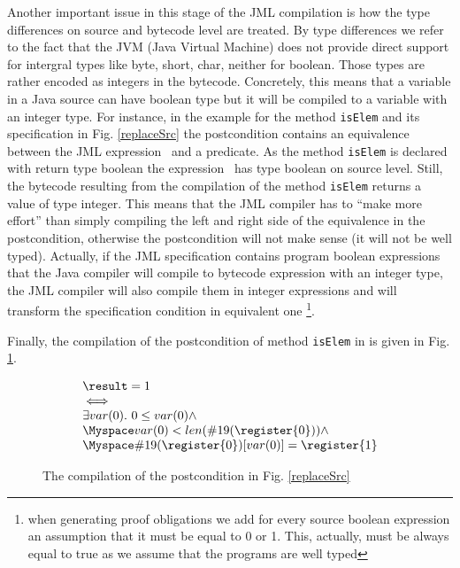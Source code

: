 \begin{enumerate}
Another important issue in this stage of the JML compilation is how the type differences on source and bytecode level are treated. 
By type differences we refer to the fact that the JVM (Java Virtual Machine) does not provide direct support for intergral types like byte, short, char, neither for boolean. Those types are rather encoded as integers in the bytecode. Concretely, this means that a variable in a Java source can have boolean type but it will be compiled to a variable with
an integer type.%
 For instance, in the example for the method 
\texttt{isElem} and its specification in Fig. \ref{replaceSrc}  the postcondition contains an equivalence between the JML expression  
\result \ and a predicate. As the method \texttt{isElem} is declared with return type boolean the expression \result \ has type boolean on source level. 
Still, the bytecode resulting from the compilation of the method  \texttt{isElem} returns a value of type integer. This means that the JML compiler has to 
``make more effort'' than simply compiling the left and right side of the equivalence in the postcondition, otherwise the postcondition will not make sense
 (it will not be well typed). Actually, 
if the JML specification contains program boolean expressions that the Java compiler will compile to bytecode expression with an integer type, the JML compiler 
will also compile them in integer expressions and will transform the specification condition in equivalent one 
\footnote{when generating proof obligations we add for every source boolean expression an assumption that it must be equal to 0 or 1. This, actually, must be always
equal to true as we assume that the programs are well typed}.  

Finally, the compilation of the postcondition of method \texttt{isElem} in  is given in Fig. \ref{postCompile}.
\begin{figure}[tb]
 $$\begin{array}{l}
         \result = 1 \\
         \iff \\ 
         \exists  var(0) . \ 0 \leq var(0) \wedge \\
         \Myspace var(0) < len(\#19(\register{0})) \wedge\\
         \Myspace  \#19(\register{0})[var(0)] = \register{1}  
   \end{array}
$$
\caption{The compilation of the postcondition in Fig. \ref{replaceSrc}}
\label{postCompile}
\end{figure}


\end{enumerate}
